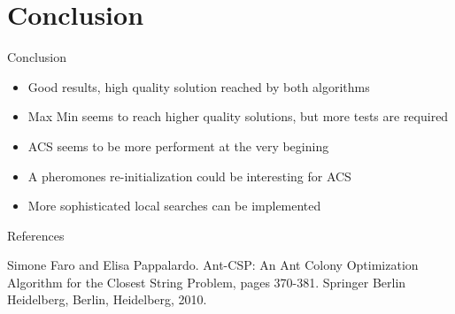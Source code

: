 \documentclass{beamer}
\begin{document}
\section{Conclusion}

\begin{frame}{Conclusion}
    \begin{itemize}
        \item Good results, high quality solution reached by both algorithms
        \item Max Min seems to reach higher quality solutions, but more tests are required
        \item ACS seems to be more performent at the very begining        \item A pheromones re-initialization could be interesting for ACS
        \item More sophisticated local searches can be implemented
    \end{itemize}
\end{frame}

\begin{frame}{References}


    \begin{thebibliography}{1}

         Simone Faro and Elisa Pappalardo.
        Ant-CSP: An Ant Colony Optimization Algorithm for the Closest String Problem, pages 370-381.
        Springer Berlin
        Heidelberg, Berlin, Heidelberg, 2010.

    \end{thebibliography}

\end{frame}
\end{document}
